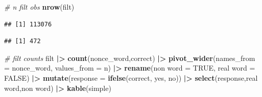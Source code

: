 \documentclass[
]{article}
\newenvironment{Shaded}{\begin{snugshade}}{\end{snugshade}}
\newcommand{\AttributeTok}[1]{\textcolor[rgb]{0.13,0.29,0.53}{#1}}
\newcommand{\CommentTok}[1]{\textcolor[rgb]{0.56,0.35,0.01}{\textit{#1}}}
\newcommand{\FunctionTok}[1]{\textcolor[rgb]{0.13,0.29,0.53}{\textbf{#1}}}
\newcommand{\NormalTok}[1]{#1}
\newcommand{\OtherTok}[1]{\textcolor[rgb]{0.56,0.35,0.01}{#1}}
\newcommand{\SpecialCharTok}[1]{\textcolor[rgb]{0.81,0.36,0.00}{\textbf{#1}}}
\newcommand{\StringTok}[1]{\textcolor[rgb]{0.31,0.60,0.02}{#1}}
\begin{document}
\begin{Shaded}
\begin{Highlighting}[]
\CommentTok{\# n filt obs}
\FunctionTok{nrow}\NormalTok{(filt)}
\end{Highlighting}
\end{Shaded}

\begin{verbatim}
## [1] 113076
\end{verbatim}

\begin{Shaded}
\end{Shaded}

\begin{verbatim}
## [1] 472
\end{verbatim}

\begin{Shaded}
\begin{Highlighting}[]
\CommentTok{\# filt counts}
\NormalTok{filt }\SpecialCharTok{|\textgreater{}} 
  \FunctionTok{count}\NormalTok{(nonce\_word,correct) }\SpecialCharTok{|\textgreater{}} 
  \FunctionTok{pivot\_wider}\NormalTok{(}\AttributeTok{names\_from =}\NormalTok{ nonce\_word, }\AttributeTok{values\_from =}\NormalTok{ n) }\SpecialCharTok{|\textgreater{}} 
  \FunctionTok{rename}\NormalTok{(}\StringTok{\textquotesingle{}non word\textquotesingle{}} \OtherTok{=} \StringTok{\textasciigrave{}}\AttributeTok{TRUE}\StringTok{\textasciigrave{}}\NormalTok{, }\StringTok{\textquotesingle{}real word\textquotesingle{}} \OtherTok{=} \StringTok{\textasciigrave{}}\AttributeTok{FALSE}\StringTok{\textasciigrave{}}\NormalTok{) }\SpecialCharTok{|\textgreater{}} 
  \FunctionTok{mutate}\NormalTok{(}\AttributeTok{response =} \FunctionTok{ifelse}\NormalTok{(correct, }\StringTok{\textquotesingle{}yes\textquotesingle{}}\NormalTok{, }\StringTok{\textquotesingle{}no\textquotesingle{}}\NormalTok{)) }\SpecialCharTok{|\textgreater{}} 
  \FunctionTok{select}\NormalTok{(response,}\StringTok{\textasciigrave{}}\AttributeTok{real word}\StringTok{\textasciigrave{}}\NormalTok{,}\StringTok{\textasciigrave{}}\AttributeTok{non word}\StringTok{\textasciigrave{}}\NormalTok{) }\SpecialCharTok{|\textgreater{}} 
  \FunctionTok{kable}\NormalTok{(}\StringTok{\textquotesingle{}simple\textquotesingle{}}\NormalTok{)}
\end{Highlighting}
\end{Shaded}
\end{document}

